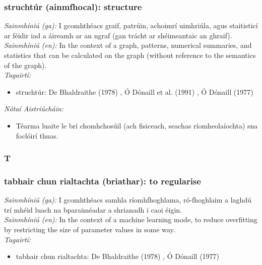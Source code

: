 \subsubsection*{struchtúr (ainmfhocal): structure}
 \noindent \textit{Sainmhíniú (ga):} I gcomhthéacs graif, patrúin, achoimrí uimhriúla, agus staitisticí ar féidir iad a áireamh ar an ngraf (gan trácht ar shéimeantaic an ghraif).
\\
 \noindent \textit{Sainmhíniú (en):} In the context of a graph, patterns, numerical summaries, and statistics that can be calculated on the graph (without reference to the semantics of the graph).
\\
 \noindent \textit{Tagairtí:}
\begin{itemize}
	\item struchtúr: De Bhaldraithe (1978) \cite{de-bhaldraithe}, Ó Dónaill et al. (1991) \cite{focloir-beag}, Ó Dónaill (1977) \cite{odonaill}
\end{itemize}

 \noindent \textit{Nótaí Aistriúcháin:}
\begin{itemize}
	\item Téarma luaite le brí chomhchosúil (ach fisiceach, seachas ríomheolaíochta) sna foclóirí thuas.
\end{itemize}


 \subsubsection*{T}

\subsubsection*{tabhair chun rialtachta (briathar): to regularise}
 \noindent \textit{Sainmhíniú (ga):} I gcomhthéacs samhla ríomhfhoghlama, ró-fhoghlaim a laghdú trí mhéid luach na bparaiméadar a shrianadh i caoi éigin.
\\
 \noindent \textit{Sainmhíniú (en):} In the context of a machine learning mode, to reduce overfitting by restricting the size of parameter values in some way.
\\
 \noindent \textit{Tagairtí:}
\begin{itemize}
	\item tabhair chun rialtachta: De Bhaldraithe (1978) \cite{de-bhaldraithe}, Ó Dónaill (1977) \cite{odonaill}
\end{itemize}

